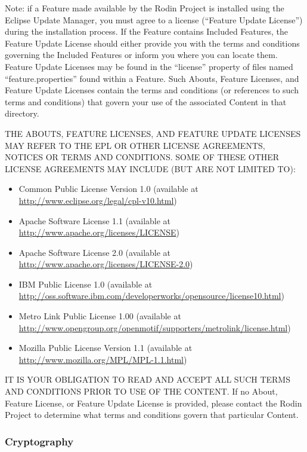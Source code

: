 Note: if a Feature made available by the Rodin Project is installed using the Eclipse Update Manager, you must agree to a license (``Feature Update License'') during the installation process. If the Feature contains Included Features, the Feature Update License should either provide you with the terms and conditions governing the Included Features or inform you where you can locate them. Feature Update Licenses may be found in the ``license'' property of files named ``feature.properties'' found within a Feature. Such Abouts, Feature Licenses, and Feature Update Licenses contain the terms and conditions (or references to such terms and conditions) that govern your use of the associated Content in that directory.

THE ABOUTS, FEATURE LICENSES, AND FEATURE UPDATE LICENSES MAY REFER TO THE EPL OR OTHER LICENSE AGREEMENTS, NOTICES OR TERMS AND CONDITIONS. SOME OF THESE OTHER LICENSE AGREEMENTS MAY INCLUDE (BUT ARE NOT LIMITED TO):
\begin{itemize}
\item Common Public License Version 1.0 (available at \url{http://www.eclipse.org/legal/cpl-v10.html})

\item Apache Software License 1.1 (available at \url{http://www.apache.org/licenses/LICENSE})

\item Apache Software License 2.0 (available at \url{http://www.apache.org/licenses/LICENSE-2.0})

\item IBM Public License 1.0 (available at \url{http://oss.software.ibm.com/developerworks/opensource/license10.html})

\item Metro Link Public License 1.00 (available at \url{http://www.opengroup.org/openmotif/supporters/metrolink/license.html})

\item Mozilla Public License Version 1.1 (available at \url{http://www.mozilla.org/MPL/MPL-1.1.html})
\end{itemize}

IT IS YOUR OBLIGATION TO READ AND ACCEPT ALL SUCH TERMS AND CONDITIONS PRIOR TO USE OF THE CONTENT. If no About, Feature License, or Feature Update License is provided, please contact the Rodin Project to determine what terms and conditions govern that particular Content.

\ifplastex
\subsubsection{Cryptography}
\label{sec:cryptography}
\else
  \ifstandalone
